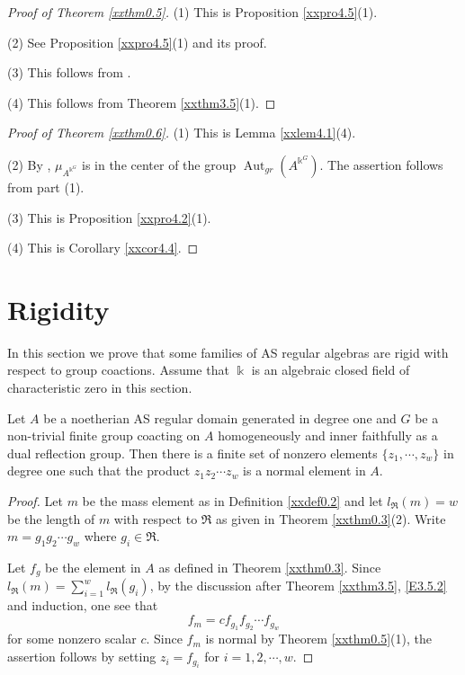 \begin{proof}[Proof of Theorem \ref{xxthm0.5}]
(1) This is Proposition \ref{xxpro4.5}(1).

(2) See Proposition \ref{xxpro4.5}(1) and its proof.

(3) This follows from \cite[Lemma 5.3(b)]{RRZ2}.

(4) This follows from Theorem \ref{xxthm3.5}(1).
\end{proof}

\begin{proof}[Proof of Theorem \ref{xxthm0.6}]
(1) This is Lemma \ref{xxlem4.1}(4).

(2) By \cite[Lemma 5.3(b)]{RRZ2}, $\mu_{A^{\Bbbk^G}}$ is 
in the center of the group $\operatorname{Aut}_{gr}(A^{\Bbbk^G})$. The assertion follows
from part (1).

(3) This is Proposition \ref{xxpro4.2}(1).

(4) This is Corollary \ref{xxcor4.4}.
\end{proof}

\section{Rigidity}
\label{xxsec5}

In this section we prove that some families of AS regular 
algebras are rigid with respect to group coactions. 
Assume that $\Bbbk$ is an algebraic closed field of 
characteristic zero in this section. 

\begin{lemma}
\label{xxlem5.1} Let $A$ be a noetherian AS regular domain
generated in degree one and $G$ be a non-trivial finite
group coacting on $A$ homogeneously and inner faithfully 
as a dual reflection group. Then there is a finite set of
nonzero elements $\{z_1,\cdots, z_w\}$ in degree one such that 
the product $z_1 z_2\cdots z_w$ is a normal element in $A$.
\end{lemma}

\begin{proof} Let $m$ be the mass element as in Definition 
\ref{xxdef0.2} and let $l_{\Re}(m)=w$ be the length of $m$
with respect to $\Re$ as given in Theorem \ref{xxthm0.3}(2).
Write $m=g_1 g_2 \cdots g_w$ where $g_i\in \Re$. 

Let $f_{g}$ be the element in $A$ as defined in Theorem 
\ref{xxthm0.3}. Since $l_{\Re}(m)=\sum_{i=1}^w l_{\Re}(g_i)$,
by the discussion after Theorem \ref{xxthm3.5}, \eqref{E3.5.2}
and induction, one see that 
\begin{equation}
\label{E5.1.1}\tag{E5.1.1}
f_{m}=c f_{g_1}f_{g_2}\cdots f_{g_w}
\end{equation}
for some nonzero scalar $c$. Since $f_{m}$ is normal 
by Theorem \ref{xxthm0.5}(1), the assertion follows
by setting $z_i= f_{g_i}$ for $i=1,2,\cdots,w$.
\end{proof}

